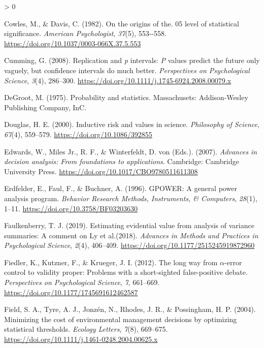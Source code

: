 \documentclass[
  english,
  ,man, a4paper,floatsintext]{apa6}
\newlength{\cslhangindent}
\newenvironment{CSLReferences}[2] %
 {%
  \setlength{\parindent}{0pt}
  \ifodd #1 \everypar{\setlength{\hangindent}{\cslhangindent}}\ignorespaces\fi
  \ifnum #2 > 0
  \setlength{\parskip}{#2\baselineskip}
  \fi
 }%
 {}
\begin{document}
\begin{CSLReferences}{1}{0}
\leavevmode\hypertarget{ref-cowles_origins_1982}{}%
Cowles, M., \& Davis, C. (1982). On the origins of the. 05 level of statistical significance. \emph{American Psychologist}, \emph{37}(5), 553-\/-558. \url{https://doi.org/10.1037/0003-066X.37.5.553}

\leavevmode\hypertarget{ref-cumming_replication_2008}{}%
Cumming, G. (2008). Replication and \emph{p} intervals: \emph{P} values predict the future only vaguely, but confidence intervals do much better. \emph{Perspectives on Psychological Science}, \emph{3}(4), 286--300. \url{https://doi.org/10.1111/j.1745-6924.2008.00079.x}

\leavevmode\hypertarget{ref-degroot1975probability}{}%
DeGroot, M. (1975). Probability and statistics. Massachusets: Addison-Wesley Publishing Company, InC.

\leavevmode\hypertarget{ref-douglas_inductive_2000}{}%
Douglas, H. E. (2000). Inductive risk and values in science. \emph{Philosophy of Science}, \emph{67}(4), 559--579. \url{https://doi.org/10.1086/392855}

\leavevmode\hypertarget{ref-edwards_advances_2007}{}%
Edwards, W., Miles Jr., R. F., \& Winterfeldt, D. von (Eds.). (2007). \emph{Advances in decision analysis: {From} foundations to applications}. Cambridge: Cambridge University Press. \url{https://doi.org/10.1017/CBO9780511611308}

\leavevmode\hypertarget{ref-erdfelder_gpower_1996}{}%
Erdfelder, E., Faul, F., \& Buchner, A. (1996). {GPOWER}: {A} general power analysis program. \emph{Behavior Research Methods, Instruments, \& Computers}, \emph{28}(1), 1--11. \url{https://doi.org/10.3758/BF03203630}

\leavevmode\hypertarget{ref-faulkenberry2019estimating}{}%
Faulkenberry, T. J. (2019). Estimating evidential value from analysis of variance summaries: A comment on {L}y et al.(2018). \emph{Advances in Methods and Practices in Psychological Science}, \emph{2}(4), 406--409. \url{https://doi.org/10.1177/2515245919872960}

\leavevmode\hypertarget{ref-fiedler_long_2012}{}%
Fiedler, K., Kutzner, F., \& Krueger, J. I. (2012). The long way from {\(\alpha\)}-error control to validity proper: {Problems with} a short-sighted false-positive debate. \emph{Perspectives on Psychological Science}, \emph{7}, 661--669. \url{https://doi.org/10.1177/1745691612462587}

\leavevmode\hypertarget{ref-field_minimizing_2004}{}%
Field, S. A., Tyre, A. J., Jonzén, N., Rhodes, J. R., \& Possingham, H. P. (2004). Minimizing the cost of environmental management decisions by optimizing statistical thresholds. \emph{Ecology Letters}, \emph{7}(8), 669--675. \url{https://doi.org/10.1111/j.1461-0248.2004.00625.x}


\end{CSLReferences}
\end{document}
